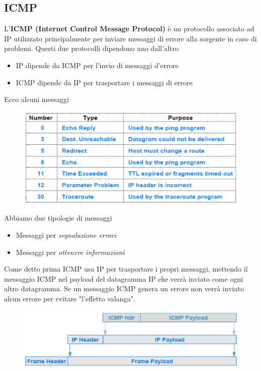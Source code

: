 \documentclass{article}
\begin{document}
        \subsection{ICMP}
            L'\textbf{ICMP (Internet Control Message Protocol)} è un protocollo associato ad IP utilizzato principalmente per inviare messaggi di errore alla sorgente in caso di problemi. Questi due protocolli dipendono uno dall'altro
            \begin{itemize}
                \item IP dipende da ICMP per l'invio di messaggi d'errore
                \item ICMP dipende da IP per trasportare i messaggi di errore
            \end{itemize}
            Ecco alcuni messaggi
            \begin{figure}[H]
                \centering
                \includegraphics[width=\textwidth]{pic/messaggi_icmp.png}
                \label{Messaggi ICMP}
            \end{figure}
            Abbiamo due tipologie di messaggi
            \begin{itemize}
                \item Messaggi per \textit{segnalazione errori}
                \item Messaggi per \textit{ottenere informazioni}
            \end{itemize}
            Come detto prima ICMP usa IP per trasportare i propri messaggi, mettendo il messaggio ICMP nel payload del datagramma IP che verrà inviato come ogni altro datagramma. Se un messaggio ICMP genera un errore non verrà inviato alcun errore per evitare "l'effetto valanga".
            \begin{figure}[H]
                \centering
                \includegraphics[width=\textwidth]{pic/icmp_ip.png}
                \label{Messaggio ICMP dentro datagramma IP}
            \end{figure}
\end{document}
